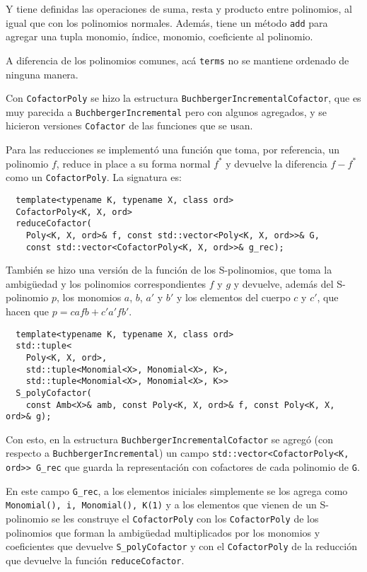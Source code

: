 \documentclass[12pt]{report}
\theoremstyle{customstyle}
\theoremstyle{factstyle}
\begin{document}
Y tiene definidas las operaciones de suma, resta y producto entre polinomios, al igual que con los polinomios normales. Además, tiene un método \texttt{add} para agregar una tupla monomio, índice, monomio, coeficiente al polinomio.

A diferencia de los polinomios comunes, acá \texttt{terms} no se mantiene ordenado de ninguna manera.

Con \texttt{CofactorPoly} se hizo la estructura \texttt{BuchbergerIncrementalCofactor}, que es muy parecida a \texttt{BuchbergerIncremental} pero con algunos agregados, y se hicieron versiones \texttt{Cofactor} de las funciones que se usan.

Para las reducciones se implementó una función que toma, por referencia, un polinomio $f$, reduce in place a su forma normal $f^*$ y devuelve la diferencia $f - f^*$ como un \texttt{CofactorPoly}. La signatura es:

\begin{verbatim}
  template<typename K, typename X, class ord>
  CofactorPoly<K, X, ord>
  reduceCofactor(
    Poly<K, X, ord>& f, const std::vector<Poly<K, X, ord>>& G,
    const std::vector<CofactorPoly<K, X, ord>>& g_rec);
\end{verbatim}

También se hizo una versión de la función de los S-polinomios, que toma la ambigüedad y los polinomios correspondientes $f$ y $g$ y devuelve, además del S-polinomio $p$, los monomios $a$, $b$, $a'$ y $b'$ y los elementos del cuerpo $c$ y $c'$, que hacen que $p = c a f b + c' a' f b'$.

\begin{verbatim}
  template<typename K, typename X, class ord>
  std::tuple<
    Poly<K, X, ord>,
    std::tuple<Monomial<X>, Monomial<X>, K>,
    std::tuple<Monomial<X>, Monomial<X>, K>>
  S_polyCofactor(
    const Amb<X>& amb, const Poly<K, X, ord>& f, const Poly<K, X, ord>& g);
\end{verbatim}

Con esto, en la estructura \texttt{BuchbergerIncrementalCofactor} se agregó (con respecto a \texttt{BuchbergerIncremental}) un campo \texttt{std::vector<CofactorPoly<K, ord>> G\_rec} que guarda la representación con cofactores de cada polinomio de \texttt{G}.

En este campo \texttt{G\_rec}, a los elementos iniciales simplemente se los agrega como \texttt{{Monomial(), i, Monomial(), K(1)}} y a los elementos que vienen de un S-polinomio se les construye el \texttt{CofactorPoly} con los \texttt{CofactorPoly} de los polinomios que forman la ambigüedad multiplicados por los monomios y coeficientes que devuelve \texttt{S\_polyCofactor} y con el \texttt{CofactorPoly} de la reducción que devuelve la función \texttt{reduceCofactor}.
\end{document}
